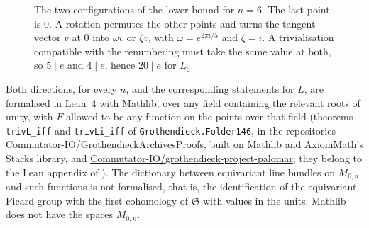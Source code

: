 \documentclass[11pt,a4paper]{amsart}
\theoremstyle{remark}
\newcommand{\M}{M_{0,n}}
\newcommand{\Sn}{\mathfrak S}
\begin{document}
\begin{figure}[ht]
\centering
{}
\caption{The two configurations of the lower bound for $n = 6$. The last point is $0$. A rotation permutes the other points and turns the tangent vector $v$ at $0$ into $\omega v$ or $\zeta v$, with $\omega = e^{2\pi i/5}$ and $\zeta = i$. A trivialisation compatible with the renumbering must take the same value at both, so $5 \mid e$ and $4 \mid e$, hence $20 \mid e$ for $L_6$.}\label{fig:rot}
\end{figure}

Both directions, for every $n$, and the corresponding statements for $L$, are formalised in Lean~4 with Mathlib, over any field containing the relevant roots of unity, with $F$ allowed to be any function on the points over that field (theorems \texttt{trivL\_iff} and \texttt{trivLi\_iff} of \texttt{Grothendieck.Folder146}, in the repositories \href{https://github.com/Commutator-IO/GrothendieckArchivesProofs}{Commutator-IO/GrothendieckArchivesProofs}, built on Mathlib and AxiomMath's Stacks library, and \href{https://github.com/Commutator-IO/grothendieck-project-palomar}{Commutator-IO/grothendieck-project-palomar}; they belong to the Lean appendix of \cite{hua2611}). The dictionary between equivariant line bundles on $\M$ and such functions is not formalised, that is, the identification of the equivariant Picard group with the first cohomology of $\Sn$ with values in the units; Mathlib does not have the spaces $\M$.
\end{document}
